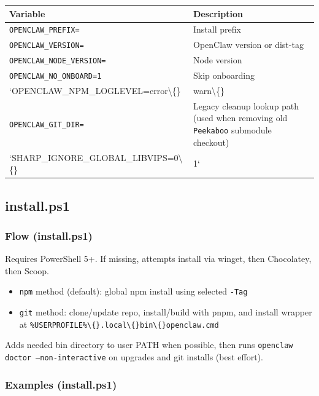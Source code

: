 \begin{table}[h]
\centering
\small
\begin{tabular}{|l|l|}
\hline
Variable & Description \\
\hline
\texttt{OPENCLAW\_PREFIX=} & Install prefix \\
\hline
\texttt{OPENCLAW\_VERSION=} & OpenClaw version or dist-tag \\
\hline
\texttt{OPENCLAW\_NODE\_VERSION=} & Node version \\
\hline
\texttt{OPENCLAW\_NO\_ONBOARD=1} & Skip onboarding \\
\hline
`OPENCLAW\_NPM\_LOGLEVEL=error\textbackslash\{\} & warn\textbackslash\{\} \\
\hline
\texttt{OPENCLAW\_GIT\_DIR=} & Legacy cleanup lookup path (used when removing old \texttt{Peekaboo} submodule checkout) \\
\hline
`SHARP\_IGNORE\_GLOBAL\_LIBVIPS=0\textbackslash\{\} & 1` \\
\hline
\end{tabular}
\end{table}




\hrulefill


\subsection{install.ps1}


\subsubsection{Flow (install.ps1)}


Requires PowerShell 5+.
If missing, attempts install via winget, then Chocolatey, then Scoop.
\begin{itemize}
  \item \texttt{npm} method (default): global npm install using selected \texttt{-Tag}
  \item \texttt{git} method: clone/update repo, install/build with pnpm, and install wrapper at \texttt{\%USERPROFILE\%\textbackslash\{\}.local\textbackslash\{\}bin\textbackslash\{\}openclaw.cmd}
\end{itemize}

Adds needed bin directory to user PATH when possible, then runs \texttt{openclaw doctor --non-interactive} on upgrades and git installs (best effort).

\subsubsection{Examples (install.ps1)}


